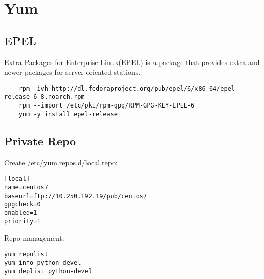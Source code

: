 \section{Yum}


\subsection{EPEL}

Extra Packages for Enterprise Linux(EPEL) 
is a package that provides extra and newer packages for server-oriented stations.


\begin{verbatim}
    rpm -ivh http://dl.fedoraproject.org/pub/epel/6/x86_64/epel-release-6-8.noarch.rpm
    rpm --import /etc/pki/rpm-gpg/RPM-GPG-KEY-EPEL-6
    yum -y install epel-release
\end{verbatim}

\subsection{Private Repo}

Create /etc/yum.repos.d/local.repo:
\begin{verbatim}
[local]
name=centos7
baseurl=ftp://10.250.192.19/pub/centos7
gpgcheck=0
enabled=1
priority=1
\end{verbatim}

Repo management:
\begin{verbatim}
yum repolist
yum info python-devel
yum deplist python-devel
\end{verbatim}
